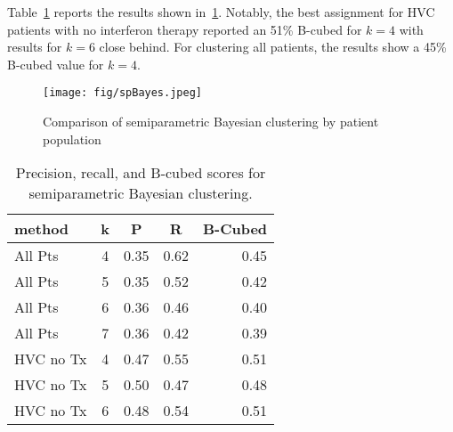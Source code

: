 Table~\ref{spbdatatable} reports the results shown in~\ref{spBayes}.  Notably, the best assignment for HVC patients with no interferon therapy reported an 51\% B-cubed for $k=4$ with results for $k=6$ close behind.  For clustering all patients, the results show a 45\% B-cubed value for $k=4$.

\begin{figure}[ht]
\vskip 0.2in
\begin{center}
\centerline{\texttt{[image: fig/spBayes.jpeg]}}
\caption{Comparison of semiparametric Bayesian clustering by patient population}
\label{spBayes}
\end{center}
\vskip -0.2in
\end{figure}

\begin{table}[ht]
\caption{Precision, recall, and B-cubed scores for semiparametric Bayesian clustering.}
\label{spbdatatable}
\vskip 0.15in
\begin{center}
\begin{tabular}{lcccr}
\hline
\hline
method	& k	& P	& R	& B-Cubed \\
\hline
\hline
All Pts	& 4& 0.35& 0.62& 0.45 \\
All Pts & 5& 0.35& 0.52& 0.42 \\
All Pts & 6& 0.36& 0.46& 0.40 \\
All Pts & 7& 0.36& 0.42& 0.39 \\
		
\hline
\hline
HVC no Tx	& 4& 0.47& 0.55& 0.51 \\
HVC no Tx & 5& 0.50& 0.47& 0.48 \\
HVC no Tx & 6& 0.48& 0.54& 0.51 \\

\hline
\end{tabular}
\end{center}
\end{table}






